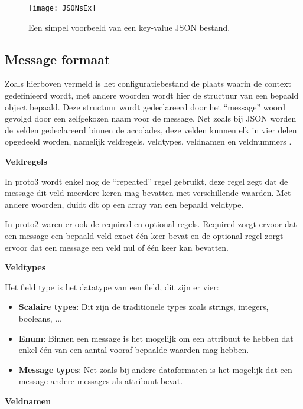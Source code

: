 \begin{figure}[H]
    \centering
    \texttt{[image: JSONsEx]}
    \caption[Simpel JSON key-value voorbeeld]{Een simpel voorbeeld van een key-value JSON bestand. \autocite{Kurian2020}}
    \label{fig:JSONsEx}
\end{figure}

\subsection{Message formaat}
\label{subsec:Message formaat}

Zoals hierboven vermeld is het configuratiebestand de plaats waarin de context gedefinieerd wordt, met andere woorden wordt hier de structuur van een bepaald object bepaald. Deze structuur wordt gedeclareerd door het “message” woord gevolgd door een zelfgekozen naam voor de message. Net zoals bij JSON worden de velden gedeclareerd binnen de accolades, deze velden kunnen elk in vier delen opgedeeld worden, namelijk veldregels, veldtypes, veldnamen en veldnummers \autocite{Google2020}.

\textbf{Veldregels}

In proto3 wordt enkel nog de “repeated” regel gebruikt, deze regel zegt dat de message dit veld meerdere keren mag bevatten met verschillende waarden. Met andere woorden, duidt dit op een array van een bepaald veldtype.

In proto2 waren er ook de required en optional regels. Required zorgt ervoor dat een message een bepaald veld exact één keer bevat en de optional regel zorgt ervoor dat een message een veld nul of één keer kan bevatten.

\textbf{Veldtypes}

Het field type is het datatype van een field, dit zijn er vier:

\begin{itemize}
    \item \textbf{Scalaire types}: Dit zijn de traditionele types zoals strings, integers, booleans, ...
    \item \textbf{Enum}: Binnen een message is het mogelijk om een attribuut te hebben dat enkel één van een aantal vooraf bepaalde waarden mag hebben.
    \item \textbf{Message types}: Net zoals bij andere dataformaten is het mogelijk dat een message andere messages als attribuut bevat.
\end{itemize}

\textbf{Veldnamen}

